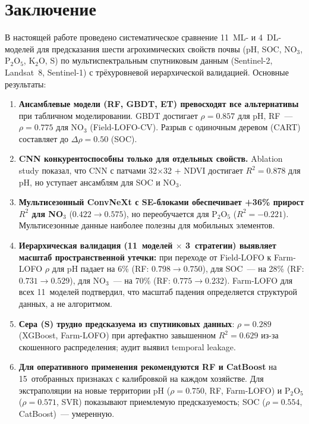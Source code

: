 \section{Заключение}
\label{sec:conclusion}

В настоящей работе проведено систематическое сравнение 11~ML- и 4~DL-моделей для предсказания шести агрохимических свойств почвы (pH, SOC, NO$_3$, P$_2$O$_5$, K$_2$O, S) по мультиспектральным спутниковым данным (Sentinel-2, Landsat~8, Sentinel-1) с трёхуровневой иерархической валидацией.
Основные результаты:

\begin{enumerate}[nosep]
  \item \textbf{Ансамблевые модели (RF, GBDT, ET) превосходят все альтернативы} при табличном моделировании.
        GBDT достигает $\rho = 0.857$ для pH, RF~--- $\rho = 0.775$ для NO$_3$ (Field-LOFO-CV).
        Разрыв с одиночным деревом (CART) составляет до $\Delta\rho = 0.50$ (SOC).

  \item \textbf{CNN конкурентоспособны только для отдельных свойств.}
        Ablation study показал, что CNN с патчами 32$\times$32 + NDVI достигает $R^2 = 0.878$ для pH, но уступает ансамблям для SOC и NO$_3$.

  \item \textbf{Мультисезонный ConvNeXt с SE-блоками обеспечивает +36\% прирост $R^2$ для NO$_3$}
        ($0.422 \to 0.575$), но переобучается для P$_2$O$_5$ ($R^2 = -0.221$).
        Мультисезонные данные наиболее полезны для мобильных элементов.

  \item \textbf{Иерархическая валидация (11~моделей $\times$ 3~стратегии) выявляет масштаб пространственной утечки:}
        при переходе от Field-LOFO к Farm-LOFO $\rho$ для pH падает на 6\% (RF: $0.798 \to 0.750$), для SOC~--- на 28\% (RF: $0.731 \to 0.529$), для NO$_3$~--- на 70\% (RF: $0.775 \to 0.232$).
        Farm-LOFO для всех 11~моделей подтвердил, что масштаб падения определяется структурой данных, а не алгоритмом.

  \item \textbf{Сера (S) трудно предсказуема из спутниковых данных}: $\rho = 0.289$ (XGBoost, Farm-LOFO) при артефактно завышенном $R^2 = 0.629$ из-за скошенного распределения; аудит выявил temporal leakage.

  \item \textbf{Для оперативного применения рекомендуются RF и CatBoost} на 15~отобранных признаках с калибровкой на каждом хозяйстве.
        Для экстраполяции на новые территории pH ($\rho = 0.750$, RF, Farm-LOFO) и P$_2$O$_5$ ($\rho = 0.571$, SVR) показывают приемлемую предсказуемость; SOC ($\rho = 0.554$, CatBoost)~--- умеренную.
\end{enumerate}

